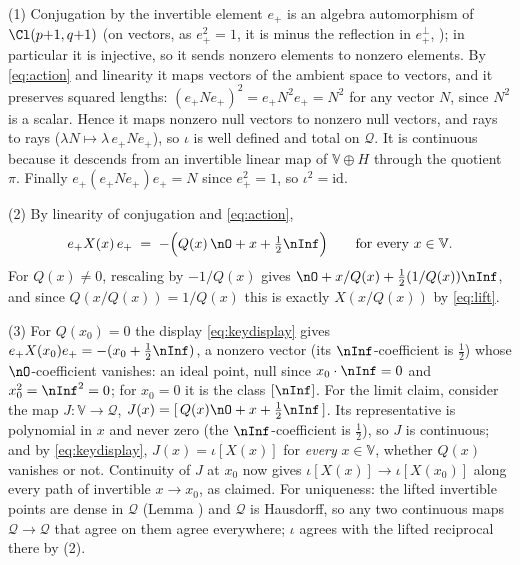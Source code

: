 (1) Conjugation by the invertible element $e_+$ is an algebra automorphism of $\Cl(p{+}1,q{+}1)$ (on vectors, as $e_+^{2} = 1$, it is minus the reflection in $e_+^{\perp}$, ); in particular it is injective, so it sends nonzero elements to nonzero elements. By \eqref{eq:action} and linearity it maps vectors of the ambient space to vectors, and it preserves squared lengths: $(e_+ N e_+)^2 = e_+ N^2 e_+ = N^2$ for any vector $N$, since $N^2$ is a scalar. Hence it maps nonzero null vectors to nonzero null vectors, and rays to rays ($\lambda N \mapsto \lambda\, e_+Ne_+$), so $\iota$ is well defined and total on $\mathcal{Q}$. It is continuous because it descends from an invertible linear map of $\mathbb{V} \oplus H$ through the quotient $\pi$. Finally $e_+ (e_+ N e_+) e_+ = N$ since $e_+^2 = 1$, so $\iota^2 = \mathrm{id}$.

(2) By linearity of conjugation and \eqref{eq:action},
\begin{equation}\label{eq:keydisplay}
e_+ X(x)\, e_+ \;=\; -\Bigl( Q(x)\,\nO + x + \tfrac12 \nInf \Bigr) \qquad \text{for every } x \in \mathbb{V}.
\end{equation}
For $Q(x) \neq 0$, rescaling by $-1/Q(x)$ gives $\nO + x/Q(x) + \tfrac12 (1/Q(x)) \nInf$, and since $Q(x/Q(x)) = 1/Q(x)$ this is exactly $X(x/Q(x))$ by \eqref{eq:lift}.

(3) For $Q(x_0) = 0$ the display \eqref{eq:keydisplay} gives $e_+ X(x_0) e_+ = -(x_0 + \tfrac12 \nInf)$, a nonzero vector (its $\nInf$-coefficient is $\tfrac12$) whose $\nO$-coefficient vanishes: an ideal point, null since $x_0 \cdot \nInf = 0$ and $x_0^2 = \nInf^2 = 0$; for $x_0 = 0$ it is the class $[\nInf]$. For the limit claim, consider the map $J : \mathbb{V} \to \mathcal{Q}$, $J(x) = [\,Q(x)\nO + x + \tfrac12\nInf\,]$. Its representative is polynomial in $x$ and never zero (the $\nInf$-coefficient is $\tfrac12$), so $J$ is continuous; and by \eqref{eq:keydisplay}, $J(x) = \iota[X(x)]$ for \emph{every} $x \in \mathbb{V}$, whether $Q(x)$ vanishes or not. Continuity of $J$ at $x_0$ now gives $\iota[X(x)] \to \iota[X(x_0)]$ along every path of invertible $x \to x_0$, as claimed. For uniqueness: the lifted invertible points are dense in $\mathcal{Q}$ (Lemma ) and $\mathcal{Q}$ is Hausdorff, so any two continuous maps $\mathcal{Q} \to \mathcal{Q}$ that agree on them agree everywhere; $\iota$ agrees with the lifted reciprocal there by (2).
